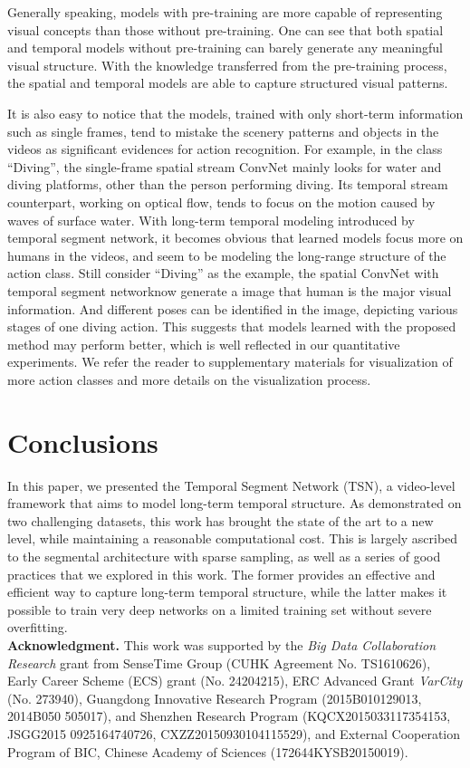 \documentclass[runningheads]{llncs}
\newcommand{\SEGNET}{temporal segment network}
\begin{document}
Generally speaking, models with pre-training are more capable of representing visual concepts than those without pre-training. One can see that both spatial and temporal models without pre-training can barely generate any meaningful visual structure. With the knowledge transferred from the pre-training process, the spatial and temporal models are able to capture structured visual patterns.

It is also easy to notice that the models, trained with only short-term information such as single frames, tend to mistake the scenery patterns and objects in the videos as significant evidences for action recognition. 
For example, in the class ``Diving'', the single-frame spatial stream ConvNet mainly looks for water and diving platforms, other than the person performing diving. Its temporal stream counterpart, working on optical flow, tends to focus on the motion caused by waves of surface water. 
With long-term temporal modeling introduced by \SEGNET , it becomes obvious that learned models focus more on humans in the videos, and seem to be modeling the long-range structure of the action class. Still consider ``Diving'' as the example, the spatial ConvNet with \SEGNET now generate a image that human is the major visual information. And different poses can be identified in the image, depicting various stages of one diving action. 
This suggests that models learned with the proposed method may perform better, 
which is well reflected in our quantitative experiments. 
We refer the reader to supplementary materials for visualization of more action classes and more details on the visualization process.

\section{Conclusions}
\label{sec:con}

In this paper, we presented the Temporal Segment Network (TSN), a video-level framework that aims to model long-term temporal structure. As demonstrated on two challenging datasets, this work has brought the state of the art to a new level, while maintaining a reasonable computational cost. This is largely ascribed to the segmental architecture with sparse sampling, as well as a series of good practices that we explored in this work. The former provides an effective and efficient way to capture long-term temporal structure, while the latter makes it possible to train very deep networks on a limited training set without severe overfitting.\\


\noindent \textbf{Acknowledgment.}
This work was supported by the \emph{Big Data Collaboration Research} grant from SenseTime Group (CUHK Agreement No. TS1610626), Early Career Scheme (ECS) grant (No. 24204215), ERC Advanced Grant {\em VarCity} (No. 273940), Guangdong Innovative Research Program (2015B010129013, 2014B050 505017), and Shenzhen Research Program (KQCX2015033117354153, JSGG2015 0925164740726, CXZZ20150930104115529), and External Cooperation Program of BIC, Chinese Academy of Sciences (172644KYSB20150019).


\clearpage



\end{document}
